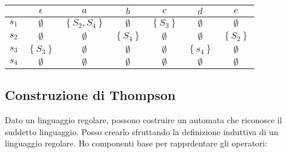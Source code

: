 \begin{center}
	\begin{tabular}{c | c c c c c c}
		\toprule
		        & $ \epsilon  $          & $ a $                       & $ b $                   & $ c $                  & $ d $                   & $ e $                   \\
		\midrule
		$ s_1 $ & $ \emptyset  $         & $ \left\{S_2, S_4\right\} $ & $ \emptyset  $          & $ \left\{S_3\right\} $ & $ \emptyset  $          & $ \emptyset  $          \\
		$ s_2 $ & $ \emptyset  $         & $ \emptyset  $              & $ \left\{S_4\right\}  $ & $ \emptyset  $         & $ \emptyset  $          & $ \left\{S_2\right\}  $ \\
		$ s_3 $ & $ \left\{S_3\right\} $ & $ \emptyset  $              & $ \emptyset  $          & $ \emptyset  $         & $ \left\{s_4\right\}  $ & $ \emptyset  $          \\
		$ s_4 $ & $ \emptyset  $         & $ \emptyset  $              & $ \emptyset  $          & $ \emptyset  $         & $ \emptyset  $          & $ \emptyset  $          \\
		\bottomrule
	\end{tabular}
\end{center}
\subsection{Construzione di Thompson}
Dato un linguaggio regolare, possono costruire un automata che riconosce il suddetto linguaggio. Posso crearlo sfruttando la definizione induttiva di un linguaggio regolare. Ho componenti base per rapprdentare gli operatori:

